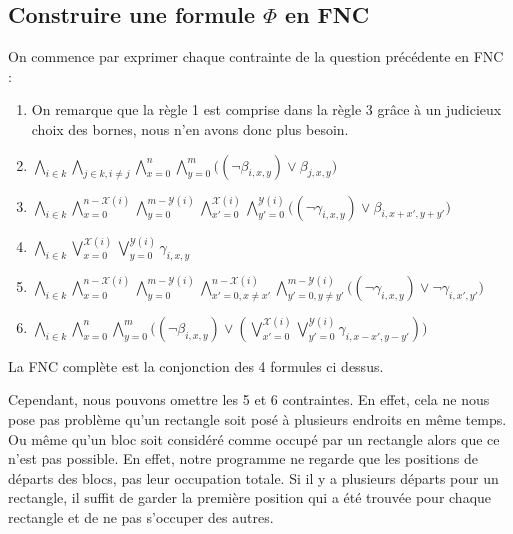 \documentclass[a4paper]{article}
\begin{document}
\subsection{Construire une formule $\Phi$ en FNC}
On commence par exprimer chaque contrainte de la question précédente en FNC :
\begin{enumerate}
  \item On remarque que la règle 1 est comprise dans la règle 3 grâce à un judicieux choix des bornes, nous n'en avons donc plus besoin.

  \item $
  \bigwedge_{i \in k} \bigwedge_{j \in k, i \neq j} \bigwedge_{x=0}^{n} \bigwedge_{y=0}^{m}
  \Big( (\lnot \beta_{i, x, y}) \lor \beta_{j, x, y} \Big)
  $

  \item $
  \bigwedge_{i \in k}
  \bigwedge_{x=0}^{n - \mathcal{X}(i)} \bigwedge_{y=0}^{m - \mathcal{Y}(i)}
  \bigwedge_{x'=0}^{\mathcal{X}(i)} \bigwedge_{y'=0}^{\mathcal{Y}(i)}
  \Big( (\lnot \gamma_{i, x, y}) \lor \beta_{i, x+x', y+y'} \Big)
  $

  \item $
  \bigwedge_{i \in k} \bigvee_{x=0}^{\mathcal{X}(i)} \bigvee_{y=0}^{\mathcal{Y}(i)} \gamma_{i, x, y}
  $

  \item $
  \bigwedge_{i \in k}
  \bigwedge_{x=0}^{n - \mathcal{X}(i)} \bigwedge_{y=0}^{m - \mathcal{Y}(i)}
  \bigwedge_{x'=0, x\neq x'}^{n - \mathcal{X}(i)} \bigwedge_{y'=0, y\neq y'}^{m - \mathcal{Y}(i)}
  \Big( (\lnot \gamma_{i, x, y}) \lor \lnot \gamma_{i, x', y'} \Big)
  $

  \item $
  \bigwedge_{i \in k} \bigwedge_{x=0}^{n} \bigwedge_{y=0}^{m} \Big(
  ( \lnot \beta_{i, x, y}) \lor
  (\bigvee_{x'=0}^{\mathcal{X}(i)} \bigvee_{y'=0}^{\mathcal{Y}(i)}
  \gamma_{i, x-x', y-y'})
  \Big)
  $


\end{enumerate}
\vspace{1em}

La FNC complète est la conjonction des 4 formules ci dessus.

Cependant, nous pouvons omettre les 5 et 6 contraintes. En effet, cela ne nous pose pas problème qu'un rectangle soit posé à plusieurs endroits en même temps. Ou même qu'un bloc soit considéré comme occupé par un rectangle alors que ce n'est pas possible. En effet, notre programme ne regarde que les positions de départs des blocs, pas leur occupation totale. Si il y a plusieurs départs pour un rectangle, il suffit de garder la première position qui a été trouvée pour chaque rectangle et de ne pas s'occuper des autres.
\end{document}
